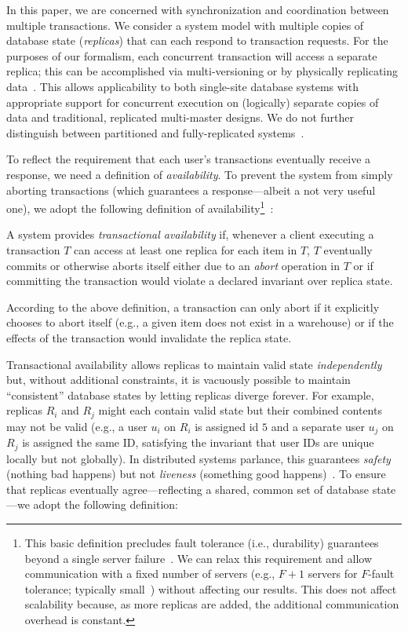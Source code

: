  In this paper, we are concerned with
synchronization and coordination between multiple transactions. We
consider a system model with multiple copies of database state
(\textit{replicas}) that can each respond to transaction requests. For
the purposes of our formalism, each concurrent transaction will access
a separate replica; this can be accomplished via multi-versioning or
by physically replicating data~\cite{bernstein-book}. This allows
applicability to both single-site database systems with appropriate
support for concurrent execution on (logically) separate copies of
data and traditional, replicated multi-master designs. We do not
further distinguish between partitioned and fully-replicated
systems~\cite{hat-vldb}.

 To reflect the requirement that each user's
transactions eventually receive a response, we need a definition of
\textit{availability}. To prevent the system from simply aborting
transactions (which guarantees a response---albeit a not very useful
one), we adopt the following definition of availability\footnote{This
  basic definition precludes fault tolerance (i.e., durability)
  guarantees beyond a single server failure~\cite{hat-vldb}. We can
  relax this requirement and allow communication with a fixed number
  of servers (e.g., $F+1$ servers for $F$-fault tolerance; typically
  small~\cite{bigtable,spanner,dynamo}) without affecting our
  results. This does not affect scalability because, as more replicas
  are added, the additional communication overhead is
  constant.}~\cite{hat-vldb}:

\begin{definition} 
A system provides \textit{transactional availability} if, whenever a
client executing a transaction $T$ can access at least one replica for
each item in $T$, $T$ eventually commits or otherwise aborts itself
either due to an \textit{abort} operation in $T$ or if committing the
transaction would violate a declared invariant over replica state.
\end{definition}

According to the above definition, a transaction can only abort if it
explicitly chooses to abort itself (e.g., a given item does not exist
in a warehouse) or if the effects of the transaction would invalidate
the replica state.

 Transactional availability allows replicas to
maintain valid state \textit{independently} but, without additional
constraints, it is vacuously possible to maintain ``consistent''
database states by letting replicas diverge forever. For example,
replicas $R_i$ and $R_j$ might each contain valid state but their
combined contents may not be valid (e.g., a user $u_i$ on $R_i$ is
assigned id $5$ and a separate user $u_j$ on $R_j$ is assigned the
same ID, satisfying the invariant that user IDs are unique locally but
not globally). In distributed systems parlance, this guarantees
\textit{safety} (nothing bad happens) but not \textit{liveness}
(something good happens)~\cite{lamport-safety}. To ensure that
replicas eventually agree---reflecting a shared, common set of
database state---we adopt the following definition:


